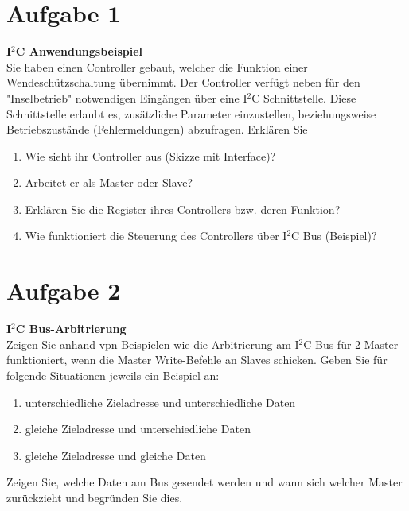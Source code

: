 \documentclass[12pt,a4paper,ngerman]{article}
\begin{document}


%
%

\section*{Aufgabe 1}


\begin{framed}
\textbf{I$^2$C Anwendungsbeispiel}\\
Sie haben einen Controller gebaut, welcher die Funktion einer Wendeschützschaltung übernimmt. Der Controller verfügt neben für den "Inselbetrieb" notwendigen Eingängen über eine I$^2$C Schnittstelle. Diese Schnittstelle erlaubt es, zusätzliche Parameter einzustellen, beziehungsweise Betriebszustände (Fehlermeldungen) abzufragen. Erklären Sie
\begin{enumerate}
\item Wie sieht ihr Controller aus (Skizze mit Interface)?
\item Arbeitet er als Master oder Slave?
\item Erklären Sie die Register ihres Controllers bzw. deren Funktion?
\item Wie funktioniert die Steuerung des Controllers über I$^2$C Bus (Beispiel)?
\end{enumerate}
\end{framed}

\pagebreak
\section*{Aufgabe 2}


\begin{framed}
\textbf{I$^2$C Bus-Arbitrierung}\\
Zeigen Sie anhand vpn Beispielen wie die Arbitrierung am I$^2$C Bus für 2 Master funktioniert, wenn die Master Write-Befehle an Slaves schicken. Geben Sie für folgende Situationen jeweils ein Beispiel an:
\begin{enumerate}
\item unterschiedliche Zieladresse und unterschiedliche Daten
\item gleiche Zieladresse und unterschiedliche Daten
\item gleiche Zieladresse und gleiche Daten
\end{enumerate}
Zeigen Sie, welche Daten am Bus gesendet werden und wann sich welcher Master zurückzieht und begründen Sie dies.
\end{framed}
\end{document}
